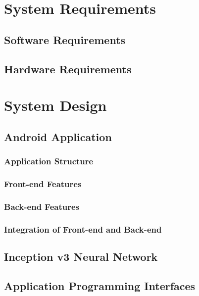 \documentclass[14pt]{report}
\begin{document}

	\chapter{System Requirements}\label{chapter2}
		
	
	
		\section{Software Requirements}
			
		\section{Hardware Requirements}

	\newpage


	\chapter{System Design}\label{chapter3}
		
	

		\section{Android Application}
			\subsection{Application Structure}
			\subsection{Front-end Features}
			\subsection{Back-end Features}
			\subsection{Integration of Front-end and Back-end}
		\section{Inception v3 Neural Network}
		\section{Application Programming Interfaces}
\end{document}

